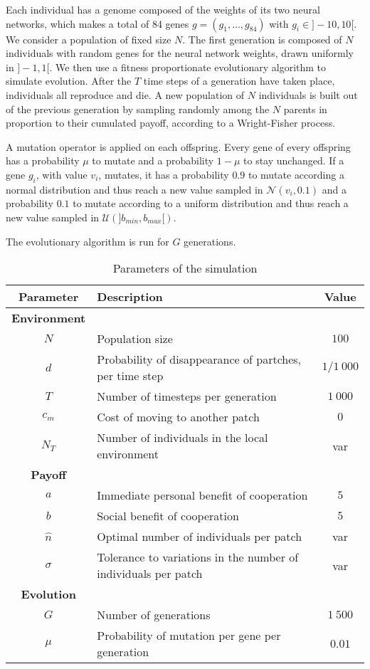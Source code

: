 Each individual has a genome composed of the weights of its two neural networks, which makes a total of 84 genes $g = (g_{1}, \ldots, g_{84})$ with $ g_{i} \in ]-10, 10[$. We consider a population of fixed size $N$. The first generation is composed of $N$ individuals with random genes for the neural network weights, drawn uniformly in $]-1, 1[$. We then use a fitness proportionate evolutionary algorithm to simulate  evolution.  After the $T$ time steps of a generation have taken place, individuals all reproduce and die. A new population of $N$ individuals is built out of the previous generation by sampling randomly among the $N$ parents in proportion to their cumulated payoff, according to a Wright-Fisher process.

A mutation operator is applied on each offspring. Every gene of every offspring has a probability $\mu$ to mutate and a probability $1-\mu$ to stay unchanged. If a gene $g_i$, with value $v_i$, mutates, it has a probability $0.9$ to mutate according a normal distribution and thus reach a new value sampled in $\mathcal{N}(v_i, 0.1)$ and a probability $0.1$ to mutate according to a uniform distribution and thus reach a new value sampled in $\mathcal{U}(]b_{min}, b_{max}[)$.

The evolutionary algorithm is run for $G$ generations.


\begin{table}
    \centering
    \begin{tabular}{clc}
        \hline
        \textbf{Parameter} & \textbf{Description} & \textbf{Value}  \\
        \hline
        \textbf{Environment} & & \\
        $N$ & Population size & $100$ \\
        $d$ & Probability of disappearance of partches, per time step & $1/1\ 000$ \\
        $T$ & Number of timesteps per generation & $1\ 000$ \\
        $c_{m}$ & Cost of moving to another patch & $0$ \\
        $N_T$ & Number of individuals in the local environment & var \\

        \textbf{Payoff } & & \\
        $a$ & Immediate personal benefit of cooperation & $5$ \\
        $b$ & Social benefit of cooperation & $5$ \\
        $\hat{n}$ & Optimal number of individuals per patch & var \\
        $\sigma$ & Tolerance to variations in the number of individuals per patch & var \\
        \textbf{Evolution} & & \\
        $G$ & Number of generations & $1\ 500$ \\
        $\mu$ & Probability of mutation per gene per generation & $0.01$ \\
        \hline

    \end{tabular}
    \caption{Parameters of the simulation}
    \label{tab:parameters}
\end{table}


